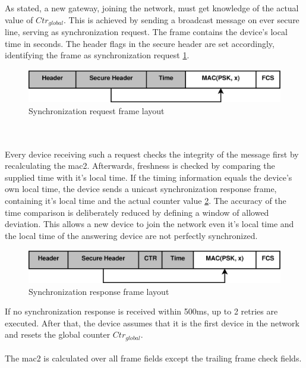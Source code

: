 As stated, a new gateway, joining the network, must get knowledge of the actual value of $Ctr_{global}$. This is achieved by sending a broadcast message on
ever secure line, 
serving as synchronization request. The frame  contains the device's local time in seconds. The header flags in the secure header are set accordingly, identifying
the frame as synchronization request \ref{fig:syncReqFormat}.
\begin{figure}
  \centering
    \includegraphics[width=1\textwidth]{figures/formatSyncReq.eps}
 \caption{Synchronization request frame layout}
 \label{fig:syncReqFormat}
\end{figure}
\\
\\
Every device receiving such a request checks the integrity of the message first by recalculating the \gls{mac2}. Afterwards, freshness is checked by comparing
the supplied time with it's local time. If the timing information equals the device's own local time, the device sends a unicast synchronization response
frame, containing it's local time and the actual counter value \ref{fig:syncResFormat}. The accuracy of the time comparison is deliberately reduced by defining
a window of allowed deviation. This allows a new device to join the network even it's local time and the local time of the answering device are not 
perfectly synchronized.
\begin{figure}
  \centering
    \includegraphics[width=1\textwidth]{figures/formatSyncRes.eps}
 \caption{Synchronization response frame layout}
 \label{fig:syncResFormat}
\end{figure}
If no synchronization response is received within 500ms, up to 2 retries are executed. After that, the device assumes that it is the first device in the
network and resets the global counter $Ctr_{global}$.
\\
\\
The \gls{mac2} is calculated over all frame fields except the trailing frame check fields. 

